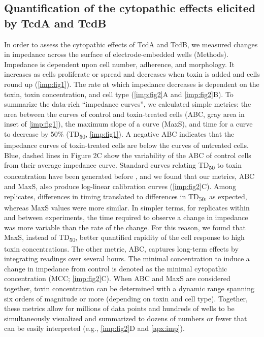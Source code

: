 \subsection{Quantification of the cytopathic effects 
              elicited by TcdA and TcdB}
In order to assess the cytopathic effects of TcdA and TcdB, 
we measured changes in impedance across the surface of 
electrode-embedded wells (Methods). Impedance is dependent 
upon cell number, adherence, and morphology. It increases 
as cells proliferate or spread and decreases when toxin is 
added and cells round up (\autoref{imp:fig1}). The rate at which impedance 
decreases is dependent on the toxin, toxin concentration, and cell 
type (\autoref{imp:fig2}A and \autoref{imp:fig2}B). To summarize the data-rich 
``impedance curves'', we calculated simple metrics: the 
area between the curves of control and toxin-treated cells 
(ABC, gray area in inset of \autoref{imp:fig1}), the maximum slope of 
a curve (MaxS), and time for a curve to decrease by 50\% (TD\textsubscript{50}, 
\autoref{imp:fig1}). A negative ABC indicates that the impedance curves 
of toxin-treated cells are below the curves of untreated 
cells. Blue, dashed lines in Figure 2C show the variability 
of the ABC of control cells from their average impedance 
curve. Standard curves relating TD\textsubscript{50} to toxin concentration 
have been generated before \cite{Xu:2012db}, and we found that our 
metrics, ABC and MaxS, also produce log-linear calibration 
curves (\autoref{imp:fig2}C). Among replicates, differences in 
timing translated to differences in TD\textsubscript{50}, as expected, 
whereas MaxS values were more similar. In simpler terms, 
for replicates within and between experiments, the time 
required to observe a change in impedance was more 
variable than the rate of the change. For this reason, 
we found that MaxS, instead of TD\textsubscript{50}, better quantified 
rapidity of the cell response to high toxin concentrations. 
The other metric, ABC, captures long-term effects by 
integrating readings over several hours. The minimal 
concentration to induce a change in impedance from control 
is denoted as the minimal cytopathic concentration 
(MCC; \autoref{imp:fig2}C). When ABC and MaxS are considered together, 
toxin concentration can be determined with a dynamic 
range spanning six orders of magnitude or more (depending 
on toxin and cell type). Together, these metrics allow 
for millions of data points and hundreds of wells to be 
simultaneously visualized and summarized to dozens of numbers 
or fewer that can be easily interpreted (e.g., \autoref{imp:fig2}D 
and \autoref{apx:imp}).

